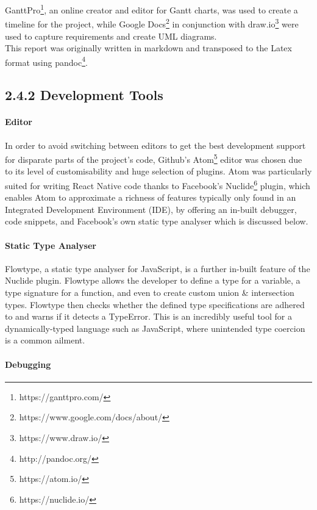 \documentclass[12pt]{report}
\let\oldparagraph\paragraph
\renewcommand{\paragraph}[1]{\oldparagraph{#1}\mbox{}}
\begin{document}
GanttPro\footnote{https://ganttpro.com/}, an online creator and
editor for Gantt charts, was used to create a timeline for the project,
while Google Docs\footnote{https://www.google.com/docs/about/}
in conjunction with draw.io\footnote{https://www.draw.io/} were
used to capture requirements and create UML diagrams.\\
This report was originally written in markdown and transposed to the
Latex format using pandoc\footnote{http://pandoc.org/}.

\subsection{2.4.2 Development Tools}\label{development-tools}

\paragraph{Editor}\label{editor}

In order to avoid switching between editors to get the best development
support for disparate parts of the project's code, Github's
Atom\footnote{https://atom.io/} editor was chosen due to its level
of customisability and huge selection of plugins. Atom was particularly
suited for writing React Native code thanks to Facebook's
Nuclide\footnote{https://nuclide.io/} plugin, which enables Atom
to approximate a richness of features typically only found in an
Integrated Development Environment (IDE), by offering an in-built
debugger, code snippets, and Facebook's own static type analyser which
is discussed below.

\paragraph{Static Type Analyser}\label{static-type-analyser}

Flowtype\cite{1flowtype}, a static type
analyser for JavaScript, is a further in-built feature of the Nuclide
plugin. Flowtype allows the developer to define a type for a variable, a
type signature for a function, and even to create custom union \&
intersection types. Flowtype then checks whether the defined type
specifications are adhered to and warns if it detects a TypeError. This
is an incredibly useful tool for a dynamically-typed language such as
JavaScript, where unintended type coercion is a common ailment.

\paragraph{Debugging}\label{debugging}
\end{document}
